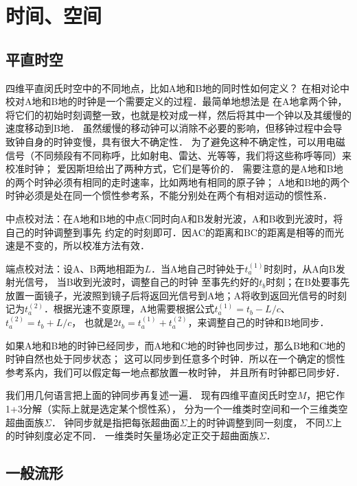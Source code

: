 \section{时间、空间}

\subsection{平直时空}
四维平直闵氏时空中的不同地点，比如A地和B地的同时性如何定义？
在相对论中校对A地和B地的时钟是一个需要定义的过程．最简单地想法是
在A地拿两个钟，将它们的初始时刻调整一致，也就是校对成一样，然后将其中一个钟以及其缓慢的速度移动到B地．
虽然缓慢的移动钟可以消除不必要的影响，但移钟过程中会导致钟自身的时钟变慢，具有很大不确定性．
为了避免这种不确定性，可以用电磁信号（不同频段有不同称呼，比如射电、雷达、光等等，我们将这些称呼等同）来校准时钟；
爱因斯坦给出了两种方式，它们是等价的．
需要注意的是A地和B地的两个时钟必须有相同的走时速率，比如两地有相同的{\kaishu 原子钟}；
A地和B地的两个时钟必须是处在同一个惯性参考系，不能分别处在两个有相对运动的惯性系．

\noindent{}中点校对法：在A地和B地的中点C同时向A和B发射光波，A和B收到光波时，将自己的时钟调整到事先
约定的时刻即可．因AC的距离和BC的距离是相等的而光速是不变的，所以校准方法有效．

\noindent{}端点校对法：设A、B两地相距为$L$．当A地自己时钟处于$t_a^{(1)}$时刻时，从A向B发射光信号，
当B收到光波时，调整自己的时钟
至事先约好的$t_b$时刻；在B处要事先放置一面镜子，光波照到镜子后将返回光信号到A地；A将收到返回光信号的时刻
记为$t_a^{(2)}$．根据光速不变原理，A地需要根据公式$t_a^{(1)}=t_b-L/c$、$t_a^{(2)}=t_b+L/c$，
也就是$2t_b=t_a^{(1)}+t_a^{(2)}$，来调整自己的时钟和B地同步．

如果A地和B地的时钟已经同步，而A地和C地的时钟也同步过，那么B地和C地的时钟自然也处于同步状态；
这可以同步到任意多个时钟．所以在一个确定的惯性参考系内，我们可以假定每一地点都放置一枚时钟，
并且所有时钟都已同步好．


我们用几何语言把上面的钟同步再复述一遍．
现有四维平直闵氏时空$M$，把它作1+3分解（实际上就是选定某个惯性系），
分为一个一维类时空间和一个三维类空超曲面族$\Sigma$．
钟同步就是指把每张超曲面$\Sigma$上的时钟调整到同一刻度，
不同$\Sigma$上的时钟刻度必定不同．
一维类时矢量场必定正交于超曲面族$\Sigma$．



\subsection{一般流形}

